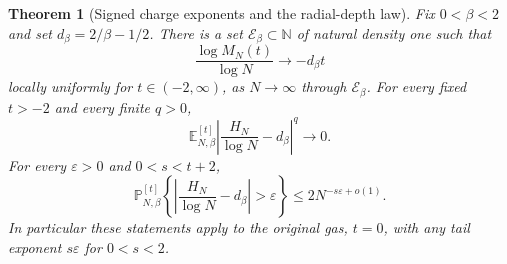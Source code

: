 \documentclass[11pt,a4paper]{article}
\numberwithin{equation}{section}
\newtheorem{theorem}{Theorem}[section]
\theoremstyle{definition}
\theoremstyle{remark}
\begin{document}
\begin{theorem}[Signed charge exponents and the radial-depth law]
\label{thm:signed-charge-radial-exponent}
Fix $0<\beta<2$ and set $d_\beta=2/\beta-1/2$.
There is a set $\mathcal E_\beta\subset\mathbb N$ of natural
 density one such that
\begin{equation}
 \frac{\log M_N(t)}{\log N}\longrightarrow-d_\beta t
 \label{eq:signed-charge-free-energy}
\end{equation}
locally uniformly for $t\in(-2,\infty)$, as $N\to\infty$ through
$\mathcal E_\beta$.  For every fixed $t>-2$ and every finite $q>0$,
\begin{equation}
 \mathbb E_{N,\beta}^{[t]}
 \left|\frac{H_N}{\log N}-d_\beta\right|^q\longrightarrow0.
 \label{eq:signed-charge-depth-convergence}
\end{equation}
For every $\varepsilon>0$ and $0<s<t+2$,
\begin{equation}
 \mathbb P_{N,\beta}^{[t]}
 \left\{\left|\frac{H_N}{\log N}-d_\beta\right|>\varepsilon\right\}
 \le2N^{-s\varepsilon+o(1)}.
 \label{eq:signed-charge-depth-tail}
\end{equation}
In particular these statements apply to the original gas, $t=0$,
with any tail exponent $s\varepsilon$ for $0<s<2$.
\end{theorem}
\end{document}
